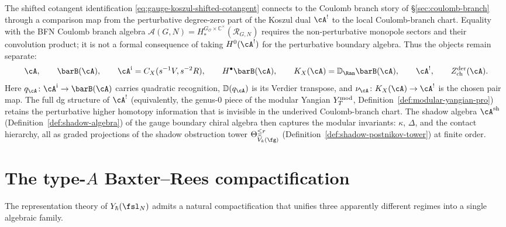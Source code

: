 \begin{remark}
\label{rem:shifted-cotangent-coulomb}
The shifted cotangent identification
\eqref{eq:gauge-koszul-shifted-cotangent} connects to the Coulomb
branch story of \S\ref{sec:coulomb-branch} through a comparison
map from the perturbative degree-zero part of the Koszul dual
\(\cA^!\) to the local Coulomb-branch chart. Equality with the BFN
Coulomb branch algebra
\(\mathcal{A}(G,N)=H^{G_{\mathcal O}\times\mathbb C^\times}_*
(\mathcal R_{G,N})\)
requires the non-perturbative monopole sectors and their convolution
product; it is not a formal consequence of taking \(H^0(\cA^!)\)
for the perturbative boundary algebra. Thus the objects remain
separate:
\[
\cA,\qquad \barB(\cA),\qquad
\cA^{\mathrm i}=C_X(s^{-1}V,s^{-2}R),\qquad
H^\bullet\barB(\cA),\qquad
K_X(\cA)=\mathbb D_{\Ran}\barB(\cA),\qquad
\cA^!,\qquad
Z^{\mathrm{der}}_{\mathrm{ch}}(\cA).
\]
Here
$q_\cA\colon\cA^{\mathrm i}\to\barB(\cA)$ carries quadratic
recognition, $\mathbb D(q_\cA)$ is its Verdier transpose, and
$\nu_\cA\colon K_X(\cA)\to\cA^!$ is the chosen pair map.
The full dg structure of $\cA^!$ (equivalently, the genus-$0$ piece
of the modular Yangian $Y^{\mathrm{mod}}_T$,
Definition~\ref{def:modular-yangian-pro}) retains the
perturbative higher homotopy information that is invisible in the
underived Coulomb-branch chart.
The shadow algebra $\cA^{\mathrm{sh}}$
(Definition~\ref{def:shadow-algebra}) of the gauge boundary chiral
algebra then captures the modular invariants: $\kappa$, $\Delta$, and
the contact hierarchy, all as graded projections of the shadow
obstruction tower $\Theta_{\widehat{V}_k(\fg)}^{\leq r}$
(Definition~\ref{def:shadow-postnikov-tower}) at finite order.
\end{remark}


\section{The type-$A$ Baxter--Rees compactification}
\label{sec:typeA-baxter-rees}

The representation theory of $Y_\hbar(\fsl_N)$ admits a natural
compactification that unifies three apparently different regimes
into a single algebraic family.

